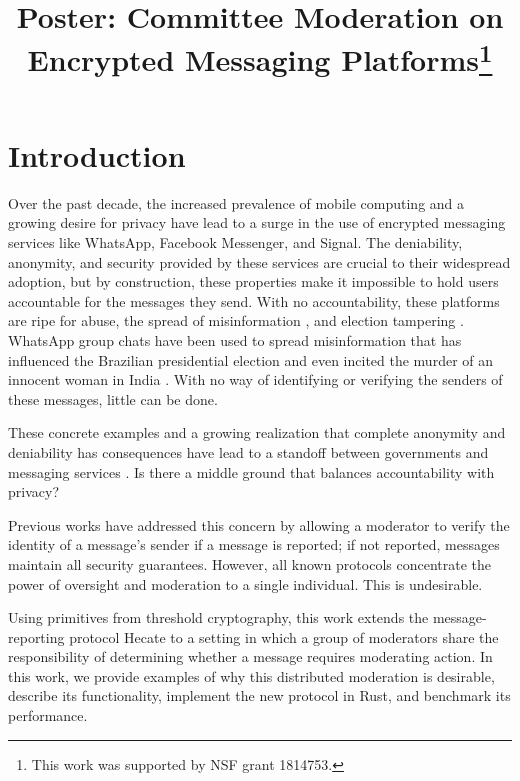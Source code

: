 \documentclass[conference]{IEEEtran}
\title{Poster: Committee Moderation on Encrypted Messaging Platforms\thanks{This work was supported by NSF grant 1814753.}}
\author{
    \IEEEauthorblockN{Alistair Pattison}
    \IEEEauthorblockA{
        \textit{University of Minnesota and Carleton College} \\
        pattisona@carleton.edu
    } \and
    \IEEEauthorblockN{Nicholas Hopper}
    \IEEEauthorblockA{
        \textit{University of Minnesota} \\
        hoppernj@umn.edu
    }
}
\begin{document}
\maketitle

\section{Introduction}

Over the past decade, the increased prevalence of mobile computing and a growing desire for privacy have lead to a surge in the use of encrypted messaging services like WhatsApp, Facebook Messenger, and Signal.
The deniability, anonymity, and security provided by these services are crucial to their widespread adoption, but by construction, these properties make it impossible to hold users accountable for the messages they send.
With no accountability, these platforms are ripe for abuse, the spread of misinformation \cite{wapo-fake-news-whatsapp}, and election tampering \cite{oxford-computational-propoganda-report}.
WhatsApp group chats have been used to spread misinformation that has influenced the Brazilian presidential election \cite{pbs-brazil-whatsapp} and even incited the murder of an innocent woman in India \cite{nytimes-whatsapp-india-murder}.
With no way of identifying or verifying the senders of these messages, little can be done.

These concrete examples and a growing realization that complete anonymity and deniability has consequences have lead to a standoff between governments and messaging services \cite{forbes-iran-whatsapp-ban, bbc-whatsapp-uk}.
Is there a middle ground that balances accountability with privacy?

Previous works have addressed this concern by allowing a moderator to verify the identity of a message's sender if a message is reported; if not reported, messages maintain all security guarantees.
However, all known protocols concentrate the power of oversight and moderation to a single individual.
This is undesirable.

Using primitives from threshold cryptography, this work extends the message-reporting protocol Hecate \cite{hecate} to a setting in which a group of moderators share the responsibility of determining whether a message requires moderating action.
In this work, we provide examples of why this distributed moderation is desirable, describe its functionality, implement the new protocol in Rust, and benchmark its performance.
\end{document}
